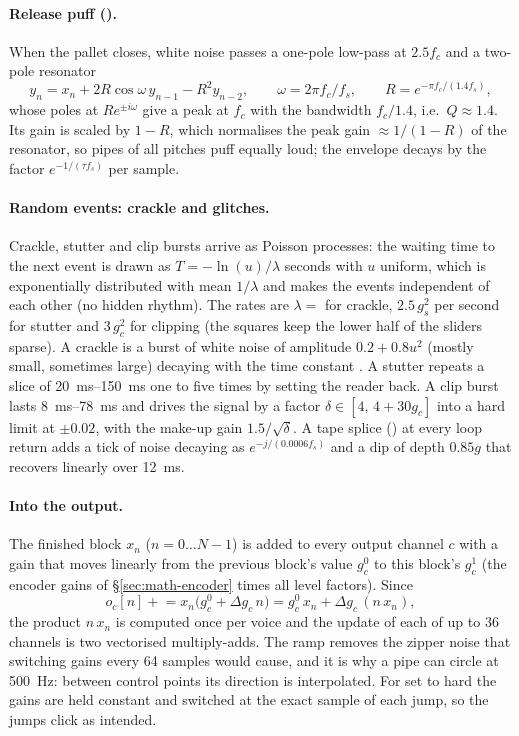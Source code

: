 \paragraph{Release puff ().} When the pallet closes, white noise passes a one-pole low-pass at $2.5f_c$ and
a two-pole resonator
\begin{equation}
  y_n = x_n + 2R\cos\omega\,y_{n-1} - R^2 y_{n-2},\qquad \omega = 2\pi f_c/f_s,\qquad R = e^{-\pi f_c/(1.4 f_s)},
\end{equation}
whose poles at $Re^{\pm i\omega}$ give a peak at $f_c$ with the bandwidth $f_c/1.4$, i.e.\ $Q\approx1.4$. Its gain is
scaled by $1-R$, which normalises the peak gain $\approx 1/(1-R)$ of the resonator, so pipes of all pitches puff
equally loud; the envelope decays by the factor $e^{-1/(\tau f_s)}$ per sample.

\paragraph{Random events: crackle and glitches.} Crackle, stutter and clip bursts arrive as Poisson processes: the
waiting time to the next event is drawn as $T = -\ln(u)/\lambda$ seconds with $u$ uniform, which is exponentially
distributed with mean $1/\lambda$ and makes the events independent of each other (no hidden rhythm). The rates are
$\lambda = $  for crackle, $2.5\,g_s^2$ per second for stutter and $3\,g_c^2$ for clipping (the squares keep
the lower half of the sliders sparse). A crackle is a burst of white noise of amplitude $0.2+0.8u^2$ (mostly small,
sometimes large) decaying with the time constant . A stutter repeats a slice of \SIrange{20}{150}{ms}
one to five times by setting the reader back. A clip burst lasts \SIrange{8}{78}{ms} and drives the signal by a factor
$\delta\in[4,\,4+30g_c]$ into a hard limit at $\pm0.02$, with the make-up gain $1.5/\sqrt\delta$. A tape splice
() at every loop return adds a tick of noise decaying as $e^{-j/(0.0006f_s)}$ and a dip of depth
$0.85g$ that recovers linearly over \SI{12}{ms}.

\paragraph{Into the output.} The finished block $x_n$ ($n = 0\dots N-1$) is added to every output channel $c$ with a
gain that moves linearly from the previous block's value $g_c^0$ to this block's $g_c^1$ (the encoder gains of
\S\ref{sec:math-encoder} times all level factors). Since
\begin{equation}
  o_c[n] \mathrel{+}= x_n\bigl(g_c^0 + \Delta g_c\,n\bigr) = g_c^0\,x_n + \Delta g_c\,(n\,x_n),
\end{equation}
the product $n\,x_n$ is computed once per voice and the update of each of up to 36 channels is two vectorised
multiply-adds. The ramp removes the zipper noise that switching gains every 64 samples would cause, and it is why a
pipe can circle at \SI{500}{Hz}: between control points its direction is interpolated. For  set to hard the
gains are held constant and switched at the exact sample of each jump, so the jumps click as intended.

